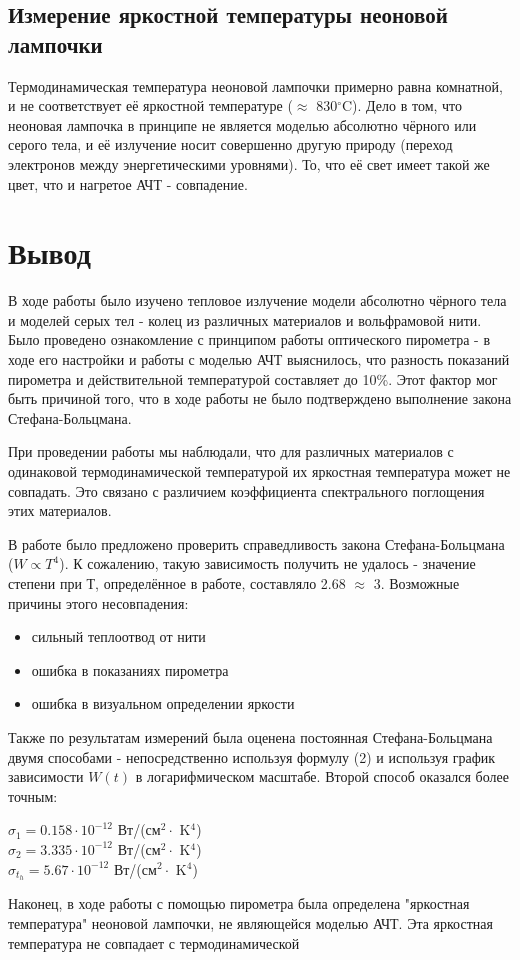 \documentclass[a4paper]{article}
\begin{document}
\subsection{Измерение яркостной температуры неоновой лампочки}
Термодинамическая температура неоновой лампочки примерно равна комнатной, и не соответствует её яркостной температуре ($\approx$ 830$^{\circ}$C). Дело в том, что неоновая лампочка в принципе не является моделью абсолютно чёрного или серого тела, и её излучение носит совершенно другую природу (переход электронов между энергетическими уровнями). То, что её свет имеет такой же цвет, что и нагретое АЧТ - совпадение.

\section{Вывод}
В ходе работы было изучено тепловое излучение модели абсолютно чёрного тела и моделей серых тел - колец из различных материалов и вольфрамовой нити. Было проведено ознакомление с принципом работы оптического пирометра - в ходе его настройки и работы с моделью АЧТ выяснилось, что разность показаний пирометра и действительной температурой составляет до 10\%. Этот фактор мог быть причиной того, что в ходе работы не было подтверждено выполнение закона Стефана-Больцмана. \par
При проведении работы мы наблюдали, что для различных материалов с одинаковой термодинамической температурой их яркостная температура может не совпадать. Это связано с различием коэффициента спектрального поглощения этих материалов. \par
В работе было предложено проверить справедливость закона Стефана-Больцмана ($W \propto T^4$). К сожалению, такую зависимость получить не удалось - значение степени при Т, определённое в работе, составляло 2.68 $\approx$ 3. Возможные причины этого несовпадения:
\begin{itemize}
    \item сильный теплоотвод от нити
    \item ошибка в показаниях пирометра
    \item ошибка в визуальном определении яркости
\end{itemize}
Также по результатам измерений была оценена постоянная Стефана-Больцмана двумя способами - непосредственно используя формулу (2) и используя график зависимости $W(t)$ в логарифмическом масштабе. Второй способ оказался более точным:
\begin{center}
    $\sigma_1 = 0.158\cdot 10^{-12}$ Вт/(см$^2 \cdot$ K$^4$) \\
    $\sigma_2 = 3.335 \cdot 10^{-12}$ Вт/(см$^2 \cdot$ K$^4$) \\
     $\sigma_t_h = 5.67\cdot 10^{-12}$ Вт/(см$^2 \cdot$ K$^4$)
\end{center}
Наконец, в ходе работы с помощью пирометра была определена "яркостная температура" неоновой лампочки, не являющейся моделью АЧТ. Эта яркостная температура не совпадает с термодинамической
\end{document}
